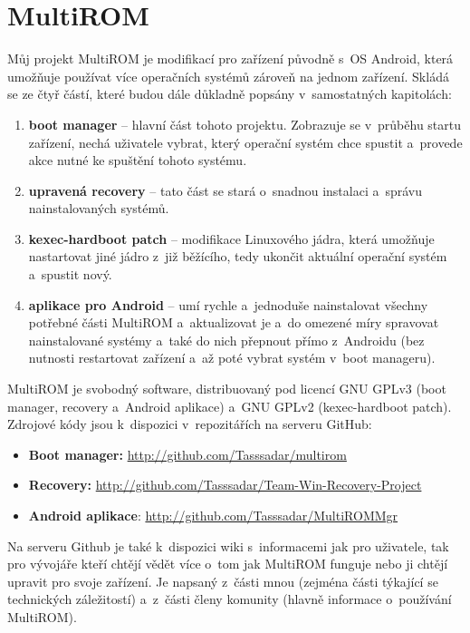 \documentclass[12pt, a4paper, oneside]{article}
\newcommand{\B}{\textbf} %
\begin{document}
\section{MultiROM}
Můj projekt MultiROM je modifikací pro zařízení původně s~OS Android, která umožňuje používat více operačních systémů zároveň na jednom zařízení. Skládá se ze čtyř částí, které budou dále důkladně popsány v~samostatných kapitolách:

\begin{enumerate}
    \item \B{boot manager} -- hlavní část tohoto projektu. Zobrazuje se v~průběhu startu zařízení, nechá uživatele vybrat, který operační systém chce spustit a~provede akce nutné ke spuštění tohoto systému.
    \item \B{upravená recovery} -- tato část se stará o~snadnou instalaci a~správu nainstalovaných systémů.
    \item \B{kexec-hardboot patch} -- modifikace Linuxového jádra, která umožňuje nastartovat jiné jádro z~již běžícího, tedy ukončit aktuální operační systém a~spustit nový.
    \item \B{aplikace pro Android} -- umí rychle a~jednoduše nainstalovat všechny potřebné části MultiROM a~aktualizovat je a~do omezené míry spravovat nainstalované systémy a~také do nich přepnout přímo z~Androidu (bez nutnosti restartovat zařízení a~až poté vybrat systém v~boot manageru).
\end{enumerate}

MultiROM je svobodný software, distribuovaný pod licencí GNU GPLv3 (boot manager, recovery a~Android aplikace) a~GNU GPLv2 (kexec-hardboot patch). Zdrojové kódy jsou k~dispozici v~repozitářích na serveru GitHub:
\begin{itemize}
    \item \B{Boot manager:} \url{http://github.com/Tasssadar/multirom}
    \item \B{Recovery:} \url{http://github.com/Tasssadar/Team-Win-Recovery-Project}
    \item \B{Android aplikace}: \url{http://github.com/Tasssadar/MultiROMMgr}
\end{itemize}

Na serveru Github je také k~dispozici wiki s~informacemi jak pro uživatele, tak pro vývojáře kteří chtějí vědět více o~tom jak MultiROM funguje nebo ji chtějí upravit pro svoje zařízení. Je napsaný z~části mnou (zejména části týkající se technických záležitostí) a~z~části členy komunity (hlavně informace o~používání MultiROM).
\end{document}

